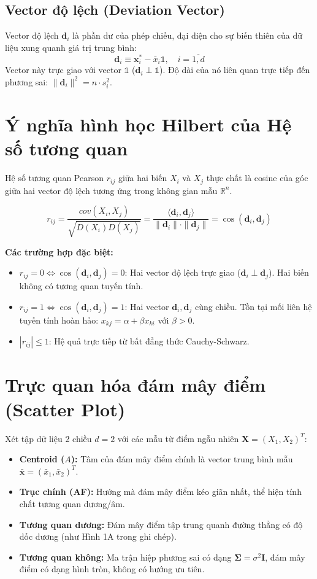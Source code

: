 \subsection{Vector độ lệch (Deviation Vector)}
Vector độ lệch $\bm{d}_i$ là phần dư của phép chiếu, đại diện cho sự biến thiên của dữ liệu xung quanh giá trị trung bình:
\[
\bm{d}_i \equiv \bm{x}^*_i - \bar{x}_i \bm{\mathbb{1}}, \quad i = \overline{1, d}
\]
\noindent Vector này trực giao với vector $\bm{\mathbb{1}}$ ($\bm{d}_i \perp \bm{\mathbb{1}}$). Độ dài của nó liên quan trực tiếp đến phương sai: $\|\bm{d}_i\|^2 = n \cdot s_i^2$.

\section{Ý nghĩa hình học Hilbert của Hệ số tương quan}

Hệ số tương quan Pearson $r_{ij}$ giữa hai biến $X_i$ và $X_j$ thực chất là cosine của góc giữa hai vector độ lệch tương ứng trong không gian mẫu $\mathbb{R}^n$.

\[
r_{ij} = \frac{cov(X_i, X_j)}{\sqrt{D(X_i) D(X_j)}} = \frac{\langle \bm{d}_i, \bm{d}_j \rangle}{\|\bm{d}_i\| \cdot \|\bm{d}_j\|} = \cos(\bm{d}_i, \bm{d}_j)
\]

\noindent \textbf{Các trường hợp đặc biệt:}
\begin{itemize}
    \item \textbf{$r_{ij} = 0 \Leftrightarrow \cos(\bm{d}_i, \bm{d}_j) = 0$}: Hai vector độ lệch trực giao ($\bm{d}_i \perp \bm{d}_j$). Hai biến không có tương quan tuyến tính.
    \item \textbf{$r_{ij} = 1 \Leftrightarrow \cos(\bm{d}_i, \bm{d}_j) = 1$}: Hai vector $\bm{d}_i, \bm{d}_j$ cùng chiều. Tồn tại mối liên hệ tuyến tính hoàn hảo: $x_{kj} = \alpha + \beta x_{ki}$ với $\beta > 0$.
    \item \textbf{$|r_{ij}| \leq 1$}: Hệ quả trực tiếp từ bất đẳng thức Cauchy-Schwarz.
\end{itemize}

\section{Trực quan hóa đám mây điểm (Scatter Plot)}
Xét tập dữ liệu 2 chiều $d=2$ với các mẫu từ điểm ngẫu nhiên $\bm{X} = (X_1, X_2)^T$:
\begin{itemize}
    \item \textbf{Centroid ($A$):} Tâm của đám mây điểm chính là vector trung bình mẫu $\bar{\bm{x}} = (\bar{x}_1, \bar{x}_2)^T$.
    \item \textbf{Trục chính (AF):} Hướng mà đám mây điểm kéo giãn nhất, thể hiện tính chất tương quan dương/âm.
    \item \textbf{Tương quan dương:} Đám mây điểm tập trung quanh đường thẳng có độ dốc dương (như Hình 1A trong ghi chép).
    \item \textbf{Tương quan không:} Ma trận hiệp phương sai có dạng $\bm{\Sigma} = \sigma^2 \bm{I}$, đám mây điểm có dạng hình tròn, không có hướng ưu tiên.
\end{itemize}


